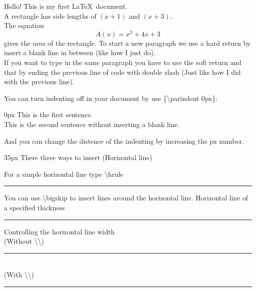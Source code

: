 \documentclass[12pt]{article}
\begin{document}
Hello! This is my first \LaTeX\ document.\\
A rectangle has side lengths of $(x+1)$ and $(x+3)$.\\
The equation $${A(x)=x^2+4x+3}$$ gives the area of the rectangle.
To start a new paragraph we use a hard return by insert a blank line in between (like how I just do).\\
If you want to type in the same paragraph you have to use the soft return and that by ending the previous line of code with double slash (Just like how I did with the previous line).

\bigskip %
You can turn indenting off in your document by use \{\textbackslash parindent 0px\}:

\parindent 0px
This is the first sentence.\\
This is the second sentence without inserting a blank line. 

\bigskip
And you can change the distence of the indenting by increasing the px number.

\parindent 35px %
There three ways to insert (Horizontal line)

For a simple horizontal line type \textbackslash hrule

\hrule
\bigskip
You can use \textbackslash bigskip to insert lines around the horizontal line.
Horizontal line of a specified thickness\\ %
\rule{\linewidth}{2pt}

Controlling the horizontal line width\\
(Without \textbackslash \textbackslash)
\noindent\rule{5cm}{2pt} \\
(With \textbackslash \textbackslash)\\
\noindent\rule{5cm}{2pt} 
\end{document}
